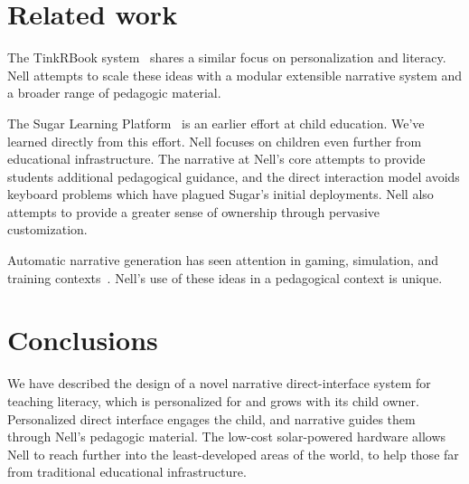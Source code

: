 \documentclass[preprint]{sig-alternate}
\begin{document}

\section{Related work}\label{sec:related}

The TinkRBook system~\cite{chang:tinkrbook} shares a similar focus on
personalization and literacy.  Nell attempts to scale these
ideas with a modular extensible narrative system and a broader range
of pedagogic material.

The Sugar Learning Platform~\cite{sugar} is an earlier effort at
child education.  We've learned directly from this effort.  Nell
focuses on children even further from educational infrastructure.
The narrative at Nell's core attempts to provide students additional
pedagogical guidance, and the direct interaction model avoids keyboard
problems which have plagued Sugar's initial deployments.  Nell also
attempts to provide a greater sense of ownership through pervasive
customization.



Automatic narrative generation has seen attention in
gaming, simulation, and training contexts~\cite{riedl:2008}.  Nell's
use of these ideas in a pedagogical context is unique.

\section{Conclusions}
We have described the design of a novel narrative direct-interface
system for teaching literacy, which is personalized for and grows with
its child owner.  Personalized direct interface engages the child, and
narrative guides them through Nell's pedagogic material.  The low-cost
solar-powered hardware allows Nell to reach further into the
least-developed areas of the world, to help those far from traditional
educational infrastructure.
\end{document}
